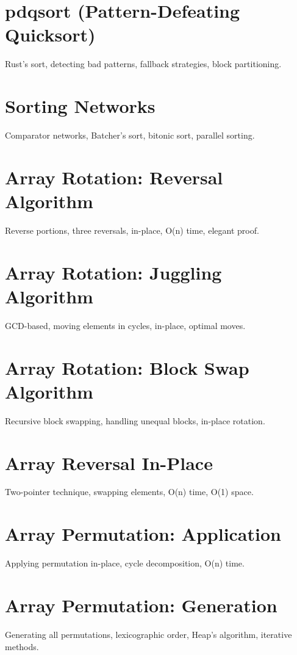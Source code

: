\chapter{pdqsort (Pattern-Defeating Quicksort)}
Rust's sort, detecting bad patterns, fallback strategies, block partitioning.

\chapter{Sorting Networks}
Comparator networks, Batcher's sort, bitonic sort, parallel sorting.


\chapter{Array Rotation: Reversal Algorithm}
Reverse portions, three reversals, in-place, O(n) time, elegant proof.

\chapter{Array Rotation: Juggling Algorithm}
GCD-based, moving elements in cycles, in-place, optimal moves.

\chapter{Array Rotation: Block Swap Algorithm}
Recursive block swapping, handling unequal blocks, in-place rotation.

\chapter{Array Reversal In-Place}
Two-pointer technique, swapping elements, O(n) time, O(1) space.

\chapter{Array Permutation: Application}
Applying permutation in-place, cycle decomposition, O(n) time.

\chapter{Array Permutation: Generation}
Generating all permutations, lexicographic order, Heap's algorithm, iterative methods.

